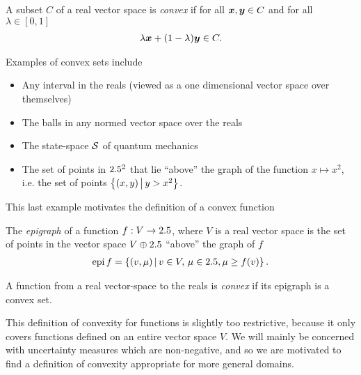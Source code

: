 \begin{defn}\label{defn:convex-set}
  A subset $C$ of a real vector space is \emph{convex} if for all $\bm{x},\bm{y}\in C$ and for all $\lambda\in [0,1]$
  \begin{align}
    \lambda \bm{x} + (1-\lambda)\bm{y}\in C.
  \end{align}
\end{defn}
Examples of convex sets include
\begin{itemize}
  \item Any interval in the reals (viewed as a one dimensional vector space over themselves)
  \item The balls in any normed vector space over the reals
  \item The state-space $\dops$ of quantum mechanics
  \item The set of points in $2.5^2$ that lie ``above'' the graph of the function $x\mapsto x^2$, i.e. the set of points $\left\{(x,y)\,\middle|\,y > x^2\right\}$.
\end{itemize}
This last example motivates the definition of a convex function
\begin{defn}\label{defn:epigraph}
  The \emph{epigraph} of a function $f:V\to2.5$, where $V$ is a real vector space is the set of points in the vector space $V\oplus 2.5$  ``above'' the graph of $f$
  \begin{align}
    \operatorname{epi} f = \left\{(v, \mu)\,\middle|\,v\in V,\, \mu\in2.5, \mu \geq f(v)\right\}.
  \end{align}
\end{defn}
\begin{defn}\label{defn:real-convex-function}
  A function from a real vector-space to the reals is \emph{convex} if its epigraph is a convex set.
\end{defn}
This definition of convexity for functions is slightly too restrictive, because it only covers functions defined on an entire vector space $V$. We will mainly be concerned with uncertainty measures which are non-negative, and so we are motivated to find a definition of convexity appropriate for more general domains.
